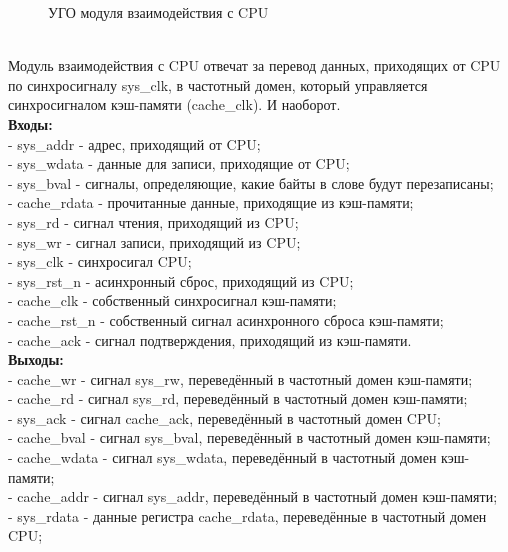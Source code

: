 \documentclass[13pt]{article}
\begin{document}
    \begin{figure}[h!]
		\caption{УГО модуля взаимодействия с CPU}
	\end{figure}\\
	Модуль взаимодействия с CPU отвечат за перевод данных, приходящих от CPU по синхросигналу sys\_clk, в частотный домен, который управляется синхросигналом кэш-памяти (cache\_clk). И наоборот.\\
	\textbf{Входы:}\\
	- sys\_addr - адрес, приходящий от CPU;\\
	- sys\_wdata - данные для записи, приходящие от CPU;\\
	- sys\_bval - сигналы, определяющие, какие байты в слове будут перезаписаны;\\
	- cache\_rdata - прочитанные данные, приходящие из кэш-памяти;\\
	- sys\_rd - сигнал чтения, приходящий из CPU;\\
	- sys\_wr - сигнал записи, приходящий из CPU;\\
	- sys\_clk - синхросигал CPU;\\
	- sys\_rst\_n - асинхронный сброс, приходящий из CPU;\\
	- cache\_clk - собственный синхросигнал кэш-памяти;\\
	- cache\_rst\_n - собственный сигнал асинхронного сброса кэш-памяти;\\
	- cache\_ack - сигнал подтверждения, приходящий из кэш-памяти.\\
	\textbf{Выходы:}\\
	- cache\_wr - сигнал sys\_rw, переведённый в частотный домен кэш-памяти;\\
	- cache\_rd - сигнал sys\_rd, переведённый в частотный домен кэш-памяти;\\
	- sys\_ack - сигнал cache\_ack, переведённый в частотный домен CPU;\\
	- cache\_bval - сигнал sys\_bval, переведённый в частотный домен кэш-памяти;\\
	- cache\_wdata - сигнал sys\_wdata, переведённый в частотный домен кэш-памяти;\\
	- cache\_addr - сигнал sys\_addr, переведённый в частотный домен кэш-памяти;\\
	- sys\_rdata - данные регистра cache\_rdata, переведённые в частотный домен CPU;\\
	
\end{document}
